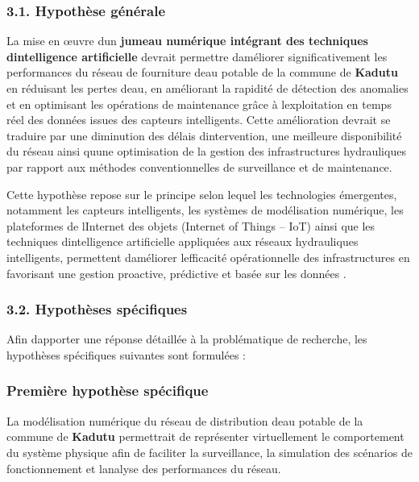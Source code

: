 \documentclass[12pt,a4paper,oneside]{report}
\begin{document}
\subsubsection{3.1. Hypothèse
générale}\label{hypothuxe8se-guxe9nuxe9rale}

La mise en œuvre d\textquotesingle un \textbf{jumeau numérique intégrant
des techniques d\textquotesingle intelligence artificielle} devrait
permettre d\textquotesingle améliorer significativement les performances
du réseau de fourniture d\textquotesingle eau potable de la commune de
\textbf{Kadutu} en réduisant les pertes d\textquotesingle eau, en
améliorant la rapidité de détection des anomalies et en optimisant les
opérations de maintenance grâce à l\textquotesingle exploitation en
temps réel des données issues des capteurs intelligents. Cette
amélioration devrait se traduire par une diminution des délais
d\textquotesingle intervention, une meilleure disponibilité du réseau
ainsi qu\textquotesingle une optimisation de la gestion des
infrastructures hydrauliques par rapport aux méthodes conventionnelles
de surveillance et de maintenance.

Cette hypothèse repose sur le principe selon lequel les technologies
émergentes, notamment les capteurs intelligents, les systèmes de
modélisation numérique, les plateformes de l\textquotesingle Internet
des objets (Internet of Things -- IoT) ainsi que les techniques
d\textquotesingle intelligence artificielle appliquées aux réseaux
hydrauliques intelligents, permettent d\textquotesingle améliorer
l\textquotesingle efficacité opérationnelle des infrastructures en
favorisant une gestion proactive, prédictive et basée sur les données
\cite{ref20}.

\subsubsection{3.2. Hypothèses
spécifiques}\label{hypothuxe8ses-spuxe9cifiques}

Afin d\textquotesingle apporter une réponse détaillée à la problématique
de recherche, les hypothèses spécifiques suivantes sont formulées :

\subsubsection{Première hypothèse
spécifique}\label{premiuxe8re-hypothuxe8se-spuxe9cifique}

La modélisation numérique du réseau de distribution
d\textquotesingle eau potable de la commune de \textbf{Kadutu}
permettrait de représenter virtuellement le comportement du système
physique afin de faciliter la surveillance, la simulation des scénarios
de fonctionnement et l\textquotesingle analyse des performances du
réseau.
\end{document}
